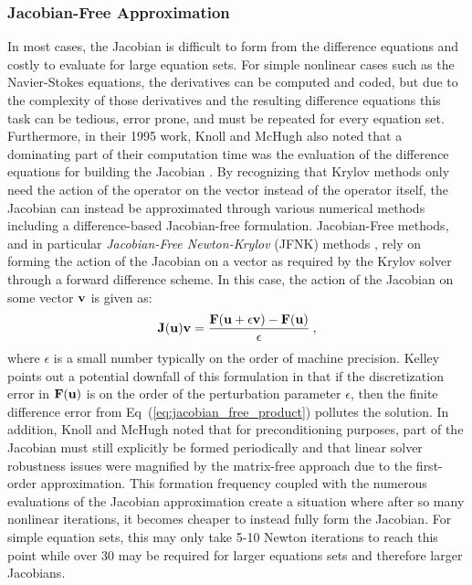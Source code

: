 \subsubsection{Jacobian-Free Approximation}
\label{subsubsec:jacobian_free_approximation}
In most cases, the Jacobian is difficult to form from the difference
equations and costly to evaluate for large equation sets. For simple
nonlinear cases such as the Navier-Stokes equations, the derivatives
can be computed and coded, but due to the complexity of those
derivatives and the resulting difference equations this task can be
tedious, error prone, and must be repeated for every equation
set. Furthermore, in their 1995 work, Knoll and McHugh also noted that
a dominating part of their computation time was the evaluation of the
difference equations for building the Jacobian
\citep{knoll_newton-krylov_1995}. By recognizing that Krylov methods
only need the action of the operator on the vector instead of the
operator itself, the Jacobian can instead be approximated through
various numerical methods including a difference-based Jacobian-free
formulation. Jacobian-Free methods, and in particular
\textit{Jacobian-Free Newton-Krylov} (JFNK) methods
\citep{knoll_jacobian-free_2004}, rely on forming the action of the
Jacobian on a vector as required by the Krylov solver through a
forward difference scheme. In this case, the action of the Jacobian on
some vector $\mathbf{v}$ is given as:
\begin{equation}
  \mathbf{J}(\mathbf{u})\mathbf{v} = \frac{\mathbf{F}(\mathbf{u} + \epsilon \mathbf{v}) -
    \mathbf{F}(\mathbf{u})}{\epsilon}\:,
  \label{eq:jacobian_free_product}
\end{equation}
where $\epsilon$ is a small number typically on the order of machine
precision. Kelley \citep{kelley_iterative_1995} points out a potential
downfall of this formulation in that if the discretization error in
$\mathbf{F}(\mathbf{u})$ is on the order of the perturbation parameter
$\epsilon$, then the finite difference error from
Eq~(\ref{eq:jacobian_free_product}) pollutes the solution. In
addition, Knoll and McHugh noted that for preconditioning purposes,
part of the Jacobian must still explicitly be formed periodically and
that linear solver robustness issues were magnified by the matrix-free
approach due to the first-order approximation. This formation
frequency coupled with the numerous evaluations of the Jacobian
approximation create a situation where after so many nonlinear
iterations, it becomes cheaper to instead fully form the
Jacobian. For simple equation sets, this may only take 5-10 Newton
iterations to reach this point while over 30 may be required for
larger equations sets and therefore larger Jacobians.

